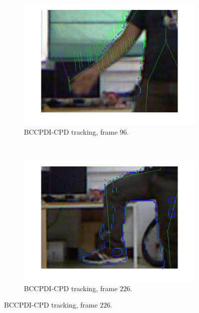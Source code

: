 \begin{figure}[h!]
        \centering

        \begin{subfigure}[b]{0.45\textwidth}
                \centering
                \includegraphics[width=\textwidth, trim=0 0 0 0,clip]{fig30.jpg}
                \caption{BCCPDI-CPD tracking, frame $96$.}
                \label{fig:cp02_comparison_oflow_fails_elbow_cpd_side}
        \end{subfigure}%
	~
        \begin{subfigure}[b]{0.45\textwidth}
                \centering
                \includegraphics[width=\textwidth, trim=0 0 0 0,clip]{fig31.jpg}
                \caption{BCCPDI-CPD tracking, frame $226$.}
                \label{fig:cp02_comparison_oflow_fails_knee_cpd_side}
        \end{subfigure}%


\end{figure}

